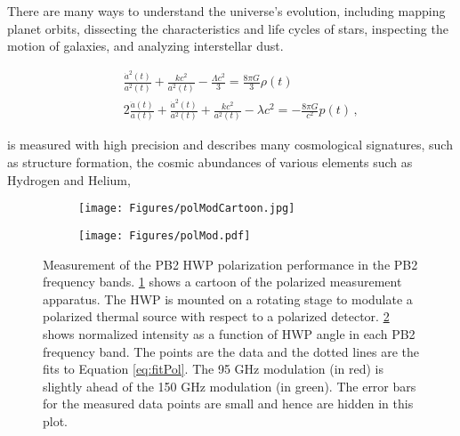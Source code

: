 There are many ways to understand the universe's evolution, including mapping planet orbits, dissecting the characteristics and life cycles of stars, inspecting the motion of galaxies, and analyzing interstellar dust.

\begin{eqnarray}
    & & \frac{\dot{a}^{2}(t)}{a^{2}(t)} + \frac{k c^{2}}{a^{2}(t)} - \frac{\Lambda c^{2}}{3} = \frac{8 \pi G}{3} \rho(t) \\
    & & 2 \frac{\ddot{a}(t)}{a(t)} + \frac{\dot{a}^{2}(t)}{a^{2}(t)} + \frac{k c^{2}}{a^{2}(t)} - \lambda c^{2} = - \frac{8 \pi G}{c^{2}} p(t) \, ,
\end{eqnarray}



is measured with high precision and describes many cosmological signatures, such as structure formation, the cosmic abundances of various elements such as Hydrogen and Helium, 

\begin{figure}
\centering
\begin{subfigure}{.44\textwidth}
  	\centering
  	\texttt{[image: Figures/polModCartoon.jpg]}
   	\caption{\label{fig:polModCartoon}}
\end{subfigure}%
\begin{subfigure}{.56\textwidth}
  	\centering
  	\texttt{[image: Figures/polMod.pdf]}
  	\caption{\label{fig:polModPlot}}
\end{subfigure}
\caption{Measurement of the PB2 HWP polarization performance in the PB2 frequency bands. \ref{fig:polModCartoon} shows a cartoon of the polarized measurement apparatus. The HWP is mounted on a rotating stage to modulate a polarized thermal source with respect to a polarized detector. \ref{fig:polModPlot} shows normalized intensity as a function of HWP angle in each PB2 frequency band. The points are the data and the dotted lines are the fits to Equation \ref{eq:fitPol}. The 95 GHz modulation (in red) is slightly ahead of the 150 GHz modulation (in green). The error bars for the measured data points are small and hence are hidden in this plot. \label{fig:polMod}}
\end{figure}

